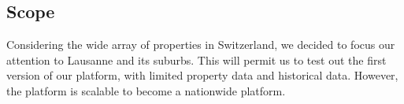 \documentclass[main]{subfiles}
\begin{document}
\subsection{Scope}
Considering the wide array of properties in Switzerland, we decided to focus our attention to Lausanne and its suburbs. This will permit us to test out the first version of our platform, with limited property data and historical data. However, the platform is scalable to become a nationwide platform. 
\end{document}
